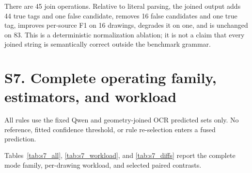 \documentclass[11pt]{article}
\begin{document}
There are 45 join operations. Relative to literal parsing, the joined output
adds 44 true tags and one false candidate, removes 16 false candidates and one
true tag, improves per-source F1 on 16 drawings, degrades it on one, and is
unchanged on 83. This is a deterministic normalization ablation; it is not a
claim that every joined string is semantically correct outside the benchmark
grammar.

\section*{S7. Complete operating family, estimators, and workload}

All rules use the fixed Qwen and geometry-joined OCR predicted sets only. No
reference, fitted confidence threshold, or rule re-selection enters a fused
prediction.

Tables~\ref{tab:s7_all}, \ref{tab:s7_workload}, and \ref{tab:s7_diffs} report
the complete mode family, per-drawing workload, and selected paired contrasts.

\begin{table}[H]
\centering
\caption{Set B components and complete four-rule family. The non-empty macro
column averages only the 93 sources containing at least one reference tag.}
\label{tab:s7_all}
\scriptsize
{}
\end{table}
\end{document}
